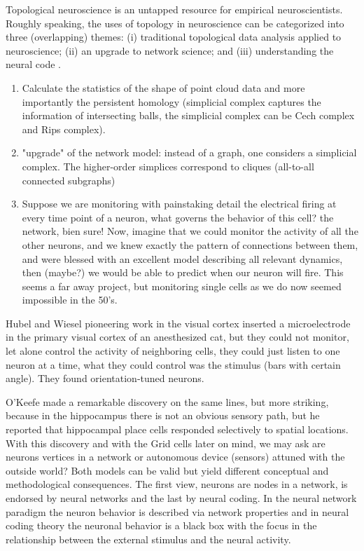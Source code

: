 \documentclass[onecollarge,runningheads]{svjour2}
\begin{document}
Topological neuroscience is an untapped resource for empirical neuroscientists.
Roughly speaking, the uses of topology in neuroscience can be categorized into three (overlapping) themes: (i) traditional topological data analysis applied to neuroscience; (ii) an upgrade to network science; and (iii) understanding the neural code \citep{curto2016can}.

\begin{enumerate}
\item  Calculate the statistics of the shape of point cloud data and more importantly the persistent homology (simplicial complex captures the information of intersecting balls, the simplicial complex can be Cech complex and Rips complex).
\item  "upgrade" of the network model: instead of a graph, one considers a simplicial complex. The higher-order simplices correspond to cliques (all-to-all connected subgraphs)
\item Suppose we are monitoring with painstaking detail the electrical firing at every time point of a neuron, what governs the behavior of this cell? the network, bien sure!  Now, imagine that we could monitor the activity of all the other neurons, and we knew exactly the pattern of connections between them, and were blessed with an excellent model describing all relevant dynamics, then (maybe?) we would be able to predict when our neuron will fire. This seems a far away project, but monitoring  single cells as we do now seemed impossible in the 50's. %

\end{enumerate}

Hubel and Wiesel pioneering work in the visual cortex inserted a microelectrode in the primary visual cortex of an anesthesized cat, but they could not monitor, let alone control the activity of neighboring cells, they could just listen to one neuron at a time, what they could control was the stimulus (bars with certain angle). They found orientation-tuned neurons.

O'Keefe made a remarkable discovery on the same lines, but more striking, because in the hippocampus there is not an obvious sensory path, but he reported that hippocampal place cells responded selectively to spatial locations.
With this discovery and with the Grid cells later on mind, we may ask are neurons vertices in a network or autonomous device (sensors) attuned with the outside world? Both models can be valid but yield different conceptual and methodological consequences. The first view, neurons are nodes in a network, is endorsed by neural networks and the last by neural coding. In the neural network paradigm the neuron behavior is described via network properties and in neural coding theory the neuronal behavior is a black box with the focus in the relationship between the external stimulus and the neural activity.
\end{document}
